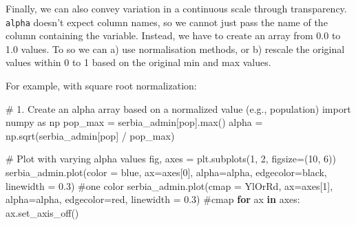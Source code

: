 \documentclass[
  letterpaper,
  DIV=11,
  numbers=noendperiod]{scrreprt}
\newenvironment{Shaded}{\begin{snugshade}}{\end{snugshade}}
\newcommand{\BuiltInTok}[1]{\textcolor[rgb]{0.00,0.23,0.31}{#1}}
\newcommand{\CommentTok}[1]{\textcolor[rgb]{0.37,0.37,0.37}{#1}}
\newcommand{\ControlFlowTok}[1]{\textcolor[rgb]{0.00,0.23,0.31}{\textbf{#1}}}
\newcommand{\DecValTok}[1]{\textcolor[rgb]{0.68,0.00,0.00}{#1}}
\newcommand{\FloatTok}[1]{\textcolor[rgb]{0.68,0.00,0.00}{#1}}
\newcommand{\ImportTok}[1]{\textcolor[rgb]{0.00,0.46,0.62}{#1}}
\newcommand{\KeywordTok}[1]{\textcolor[rgb]{0.00,0.23,0.31}{\textbf{#1}}}
\newcommand{\NormalTok}[1]{\textcolor[rgb]{0.00,0.23,0.31}{#1}}
\newcommand{\OperatorTok}[1]{\textcolor[rgb]{0.37,0.37,0.37}{#1}}
\newcommand{\StringTok}[1]{\textcolor[rgb]{0.13,0.47,0.30}{#1}}
\begin{document}
Finally, we can also convey variation in a continuous scale through
transparency. \texttt{alpha} doesn't expect column names, so we cannot
just pass the name of the column containing the variable. Instead, we
have to create an array from 0.0 to 1.0 values. To so we can a) use
normalisation methods, or b) rescale the original values within 0 to 1
based on the original min and max values.

For example, with square root normalization:

\begin{Shaded}
\begin{Highlighting}[]
\CommentTok{\# 1. Create an alpha array based on a normalized value (e.g., population)}
\ImportTok{import}\NormalTok{ numpy }\ImportTok{as}\NormalTok{ np}
\NormalTok{pop\_max }\OperatorTok{=}\NormalTok{ serbia\_admin[}\StringTok{\textquotesingle{}pop\textquotesingle{}}\NormalTok{].}\BuiltInTok{max}\NormalTok{()}
\NormalTok{alpha }\OperatorTok{=}\NormalTok{ np.sqrt(serbia\_admin[}\StringTok{\textquotesingle{}pop\textquotesingle{}}\NormalTok{] }\OperatorTok{/}\NormalTok{ pop\_max) }
\end{Highlighting}
\end{Shaded}

\begin{Shaded}
\begin{Highlighting}[]
\CommentTok{\# Plot with varying alpha values}
\NormalTok{fig, axes }\OperatorTok{=}\NormalTok{ plt.subplots(}\DecValTok{1}\NormalTok{, }\DecValTok{2}\NormalTok{, figsize}\OperatorTok{=}\NormalTok{(}\DecValTok{10}\NormalTok{, }\DecValTok{6}\NormalTok{))}
\NormalTok{serbia\_admin.plot(color }\OperatorTok{=} \StringTok{\textquotesingle{}blue\textquotesingle{}}\NormalTok{, ax}\OperatorTok{=}\NormalTok{axes[}\DecValTok{0}\NormalTok{], alpha}\OperatorTok{=}\NormalTok{alpha, edgecolor}\OperatorTok{=}\StringTok{\textquotesingle{}black\textquotesingle{}}\NormalTok{, linewidth }\OperatorTok{=} \FloatTok{0.3}\NormalTok{) }\CommentTok{\#one color}
\NormalTok{serbia\_admin.plot(cmap }\OperatorTok{=} \StringTok{\textquotesingle{}YlOrRd\textquotesingle{}}\NormalTok{, ax}\OperatorTok{=}\NormalTok{axes[}\DecValTok{1}\NormalTok{], alpha}\OperatorTok{=}\NormalTok{alpha, edgecolor}\OperatorTok{=}\StringTok{\textquotesingle{}red\textquotesingle{}}\NormalTok{, linewidth }\OperatorTok{=} \FloatTok{0.3}\NormalTok{) }\CommentTok{\#cmap}
\ControlFlowTok{for}\NormalTok{ ax }\KeywordTok{in}\NormalTok{ axes:}
\NormalTok{    ax.set\_axis\_off()}
\end{Highlighting}
\end{Shaded}
\end{document}
